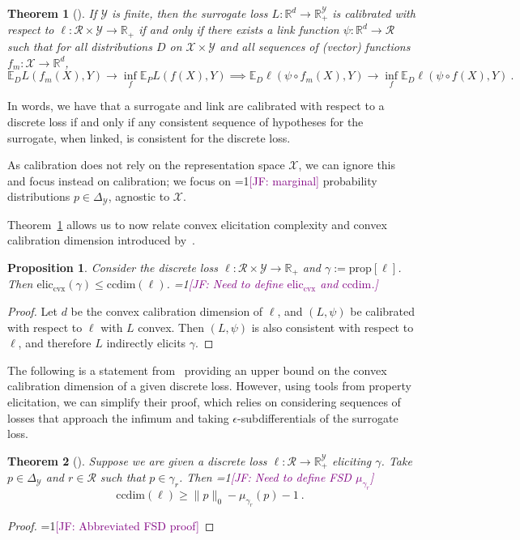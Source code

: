 \documentclass{article}
\newcommand{\Comments}{1}
\newcommand{\mynote}[2]{\ifnum\Comments=1\textcolor{#1}{#2}\fi}
\newcommand{\jessie}[1]{\mynote{purple}{[JF: #1]}}
\newcommand{\reals}{\mathbb{R}}
\newcommand{\simplex}{\Delta_\Y}
\newcommand{\prop}[1]{\mathrm{prop}[#1]}
\newcommand{\eliccvx}{\mathrm{elic}_\mathrm{cvx}}
\newcommand{\ccdim}{\mathrm{ccdim}}
\newcommand{\E}{\mathbb{E}}
\newcommand{\R}{\mathcal{R}}
\newcommand{\X}{\mathcal{X}}
\newcommand{\Y}{\mathcal{Y}}
\newtheorem{theorem}{Theorem}
\newtheorem{proposition}{Proposition}
\begin{document}
\begin{theorem}[\cite{ramaswamy2016convex}]\label{thm:calib-iff-consistent}
	If $\Y$ is finite, then the surrogate loss $L:\reals^d \to \reals^\Y_+$ is calibrated with respect to $\ell: \R \times \Y \to \reals_+$ if and only if there exists a link function $\psi : \reals^d \to \R$ such that for all distributions $D$ on $\X \times\Y$ and all sequences of (vector) functions $f_m : \X \to \reals^d$,
	\begin{equation*}
	\E_D L(f_m(X), Y) \to \inf_f \E_P L(f(X), Y) \implies \E_D \ell(\psi  \circ f_m(X), Y) \to \inf_f \E_D \ell(\psi \circ f(X), Y)~.~
	\end{equation*}
\end{theorem}
In words, we have that a surrogate and link are calibrated with respect to a discrete loss if and only if any consistent sequence of hypotheses for the surrogate, when linked, is consistent for the discrete loss.

As calibration does not rely on the representation space $\X$, we can ignore this and focus instead on calibration; we focus on \jessie{marginal} probability distributions $p \in \simplex$, agnostic to $\X$.

Theorem~\ref{thm:calib-iff-consistent} allows us to now relate convex elicitation complexity and convex calibration dimension introduced by~\cite[Definition 10]{ramaswamy2016convex}.
\begin{proposition}
	Consider the discrete loss $\ell : \R \times \Y \to \reals_+$ and $\gamma:= \prop{\ell}$.
	Then $\eliccvx(\gamma) \leq \ccdim(\ell)$.
	\jessie{Need to define $\eliccvx$ and $\ccdim$.}
\end{proposition}
\begin{proof}
	Let $d$ be the convex calibration dimension of $\ell$, and $(L, \psi)$ be calibrated with respect to $\ell$ with $L$ convex.
	Then $(L, \psi)$ is also consistent with respect to $\ell$, and therefore $L$ indirectly elicits $\gamma$.
\end{proof}


The following is a statement from~\cite{ramaswamy2016convex} providing an upper bound on the convex calibration dimension of a given discrete loss.
However, using tools from property elicitation, we can simplify their proof, which relies on considering sequences of losses that approach the infimum and taking $\epsilon$-subdifferentials of the surrogate loss.

\begin{theorem}[\cite{ramaswamy2016convex}]
	Suppose we are given a discrete loss $\ell:\R \to \reals^\Y_+$ eliciting $\gamma$.
	Take $p \in \simplex$ and $r \in \R$ such that $p \in \gamma_r$.
	Then \jessie{Need to define FSD $\mu_{\gamma_r}$}
	\begin{equation}
	\ccdim(\ell) \geq \|p\|_0 - \mu_{\gamma_r}(p) - 1~.~
	\end{equation}
\end{theorem}
\begin{proof}
	\jessie{Abbreviated FSD proof}
\end{proof}
\end{document}
